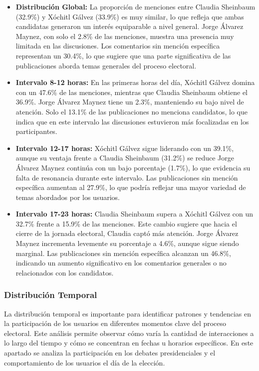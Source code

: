 \documentclass[10pt, a4paper]{article}
\begin{document}
	\begin{itemize}
		\item \textbf{Distribución Global:} La proporción de menciones entre Claudia Sheinbaum (32.9\%) y Xóchitl Gálvez (33.9\%) es muy similar, lo que refleja que ambas candidatas generaron un interés equiparable a nivel general. Jorge Álvarez Maynez, con solo el 2.8\% de las menciones, muestra una presencia muy limitada en las discusiones. Los comentarios sin mención específica representan un 30.4\%, lo que sugiere que una parte significativa de las publicaciones aborda temas generales del proceso electoral.
		
		\item \textbf{Intervalo 8-12 horas:} En las primeras horas del día, Xóchitl Gálvez domina con un 47.6\% de las menciones, mientras que Claudia Sheinbaum obtiene el 36.9\%. Jorge Álvarez Maynez tiene un 2.3\%, manteniendo su bajo nivel de atención. Solo el 13.1\% de las publicaciones no menciona candidatos, lo que indica que en este intervalo las discusiones estuvieron más focalizadas en los participantes.
		
		\item \textbf{Intervalo 12-17 horas:} Xóchitl Gálvez sigue liderando con un 39.1\%, aunque su ventaja frente a Claudia Sheinbaum (31.2\%) se reduce Jorge Álvarez Maynez continúa con un bajo porcentaje (1.7\%), lo que evidencia su falta de resonancia durante este intervalo. Las publicaciones sin mención específica aumentan al 27.9\%, lo que podría reflejar una mayor variedad de temas abordados por los usuarios.
		
		\item \textbf{Intervalo 17-23 horas:} Claudia Sheinbaum supera a Xóchitl Gálvez con un 32.7\% frente a 15.9\% de las menciones. Este cambio sugiere que hacia el cierre de la jornada electoral, Claudia captó más atención. Jorge Álvarez Maynez incrementa levemente su porcentaje a 4.6\%, aunque sigue siendo marginal. Las publicaciones sin mención específica alcanzan un 46.8\%, indicando un aumento significativo en los comentarios generales o no relacionados con los candidatos.
	\end{itemize}
	
	
	\subsubsection{Distribución Temporal}
	
	La distribución temporal es importante para identificar patrones y tendencias en la participación de los usuarios en diferentes momentos clave del proceso electoral. Este análisis permite observar cómo varía la cantidad de interacciones a lo largo del tiempo y cómo se concentran en fechas u horarios específicos. En este apartado se analiza la participación en los debates presidenciales y el comportamiento de los usuarios el día de la elección.
	
\end{document}
